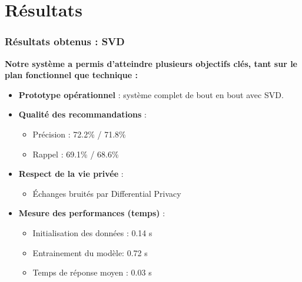 \documentclass{beamer}
\begin{document}
    \section{Résultats}
    \begin{frame}
        \frametitle{Résultats obtenus : SVD}
        \scriptsize
        \textbf{Notre système a permis d’atteindre plusieurs objectifs clés, tant sur le plan fonctionnel que technique :}

        \vspace{0.3cm}
        \begin{itemize}
            \item \textbf{Prototype opérationnel} : système complet de bout en bout avec SVD.
            \item \textbf{Qualité des recommandations} :
            \begin{itemize}
                \item Précision : 72.2\% / 71.8\%
                \item Rappel : 69.1\% / 68.6\%
            \end{itemize}
            \item \textbf{Respect de la vie privée} :
            \begin{itemize}
                \item Échanges bruités par Differential Privacy
            \end{itemize}
            \item \textbf{Mesure des performances (temps)} :
            \begin{itemize}
                \item Initialisation des données : 0.14 s
                \item Entrainement du modèle: 0.72 s
                \item Temps de réponse moyen : 0.03 s
            \end{itemize}
        \end{itemize}
    \end{frame}
\end{document}
